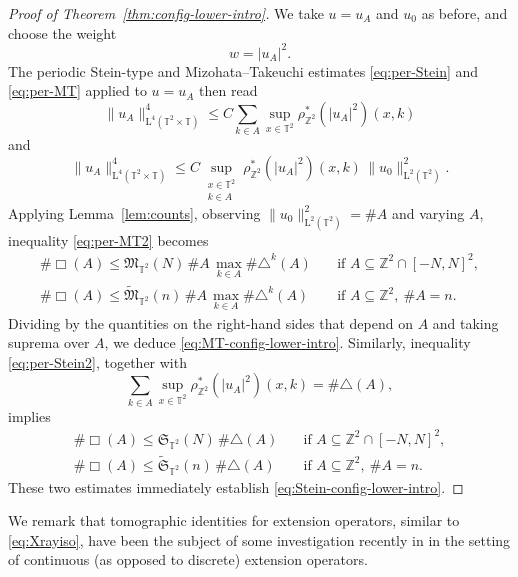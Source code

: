 \documentclass[11pt,reqno]{amsart}
\numberwithin{equation}{section}
\renewcommand{\leq}{\leqslant}
\begin{document}
\begin{proof}[Proof of Theorem~\ref{thm:config-lower-intro}]
We take $u=u_A$ and $u_0$ as before, and choose the weight
\begin{equation}\label{eq:2Dweight}
w=|u_A|^2.
\end{equation}
The periodic Stein-type and Mizohata--Takeuchi estimates \eqref{eq:per-Stein} and \eqref{eq:per-MT} applied to $u=u_A$ then read
\begin{equation}\label{eq:per-Stein2}
\|u_A\|_{\mathrm{L}^4(\mathbb{T}^2\times\mathbb{T})}^4 \leq C \sum_{k\in A} \sup_{x\in\mathbb{T}^2} \rho^{\ast}_{\mathbb{Z}^2}(|u_A|^2)(x,k)
\end{equation}
and
\begin{equation}\label{eq:per-MT2}
\|u_A\|_{\mathrm{L}^4(\mathbb{T}^2\times\mathbb{T})}^4 \leq C \sup_{\substack{x\in\mathbb{T}^2\\ k\in A}} \rho^{\ast}_{\mathbb{Z}^2}(|u_A|^2)(x,k) \,\|u_0\|_{\mathrm{L}^2(\mathbb{T}^2)}^2.
\end{equation}
Applying Lemma~\ref{lem:counts}, observing $\|u_0\|_{\mathrm{L}^2(\mathbb{T}^2)}^2=\#A$ and varying $A$, inequality \eqref{eq:per-MT2} becomes
\begin{align*} 
\#\Box(A) \leq \mathfrak{M}_{\mathbb{T}^2}(N) \,\#A \,\max_{k\in A} \#\triangle^k(A) & \quad \text{if } A\subseteq\mathbb{Z}^2\cap[-N,N]^2, \\
\#\Box(A) \leq \widetilde{\mathfrak{M}}_{\mathbb{T}^2}(n) \,\#A \,\max_{k\in A} \#\triangle^k(A) & \quad \text{if } A\subseteq\mathbb{Z}^2,\ \#A=n. 
\end{align*}
Dividing by the quantities on the right-hand sides that depend on $A$ and taking suprema over $A$, we deduce \eqref{eq:MT-config-lower-intro}.
Similarly, inequality \eqref{eq:per-Stein2}, together with
\[ \sum_{k\in A} \sup_{x\in\mathbb{T}^2}\rho^{\ast}_{\mathbb{Z}^2}(|u_A|^2)(x,k) = \#\triangle(A), \]
implies
\begin{align*} 
\#\Box(A) \leq \mathfrak{S}_{\mathbb{T}^2}(N) \,\#\triangle(A) & \quad \text{if } A\subseteq\mathbb{Z}^2\cap[-N,N]^2, \\
\#\Box(A) \leq \widetilde{\mathfrak{S}}_{\mathbb{T}^2}(n) \,\#\triangle(A) & \quad \text{if } A\subseteq\mathbb{Z}^2,\ \#A=n. 
\end{align*}
These two estimates immediately establish \eqref{eq:Stein-config-lower-intro}.
\end{proof}
We remark that tomographic identities for extension operators, similar to \eqref{eq:Xrayiso}, have been the subject of some investigation recently in \cite{BN,BNS,BGNO} in the setting of continuous (as opposed to discrete) extension operators.
\end{document}
